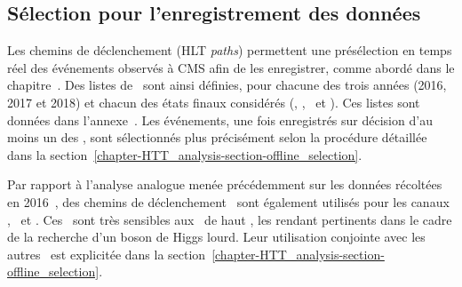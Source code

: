 \subsection{Sélection pour l'enregistrement des données}\label{chapter-HTT_analysis-section-triggers}
Les chemins de déclenchement (HLT \emph{paths}) permettent une présélection en temps réel des événements observés à CMS afin de les enregistrer, comme abordé dans le chapitre~.
Des listes de \HLTpaths\ sont ainsi définies, pour chacune des trois années (2016, 2017 et 2018) et chacun des états finaux considérés (\tauh\tauh, \mu\tauh, \ele\tauh\ et \ele\mu).
Ces listes sont données dans l'annexe~.
Les événements, une fois enregistrés sur décision d'au moins un des \HLTpaths, sont sélectionnés plus précisément selon la procédure détaillée dans la section~\ref{chapter-HTT_analysis-section-offline_selection}.
\par
Par rapport à l'analyse analogue menée précédemment sur les données récoltées en 2016~\cite{CMS-PAS-HIG-17-020}, des chemins de déclenchement \HLTSingleTau\ sont également utilisés pour les canaux \tauh\tauh, \mu\tauh\ et \ele\tauh.
Ces \HLTpaths\ sont très sensibles aux \tuah\ de haut \pT, les rendant pertinents dans le cadre de la recherche d'un boson de Higgs lourd.
Leur utilisation conjointe avec les autres \HLTpaths\ est explicitée dans la section~\ref{chapter-HTT_analysis-section-offline_selection}.

%
%
